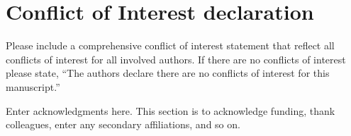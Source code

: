 \documentclass[draft]{agujournal2019}
\begin{document}
\section*{Conflict of Interest declaration}
Please include a comprehensive conflict of interest statement that reflect all conflicts of interest for all involved authors. If there are no conflicts of interest please state, “The authors declare there are no conflicts of interest for this manuscript.”



\acknowledgments
Enter acknowledgments here. This section is to acknowledge funding, thank colleagues, enter any secondary affiliations, and so on.


%
%

%



%
%
%
%
%
\end{document}
